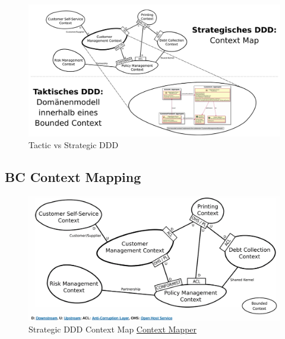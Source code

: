 \documentclass[../Main.tex]{subfiles}
\begin{document}
\begin{figure}[H]
    \centering
    \includegraphics[width=0.75\linewidth]{Images/tactic-strategic.png}
    \caption{Tactic vs Strategic DDD}
\end{figure}

\subsection{BC Context Mapping}
\begin{figure}[H]
    \centering
    \includegraphics[width=0.75\linewidth]{Images/bc-context-map.png}
    \caption{Strategic DDD Context Map \href{https://contextmapper.org/docs/examples/}{Context Mapper}}
\end{figure}
\end{document}
